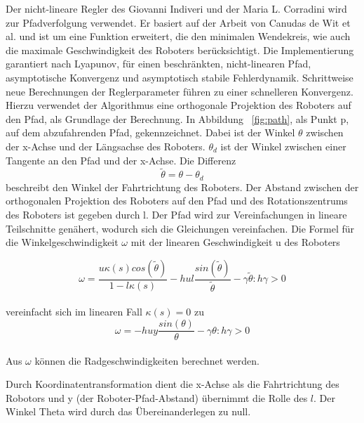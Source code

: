 \documentclass[11pt,a4paper]{article}
\begin{document}
{	Der nicht-lineare Regler des Giovanni Indiveri und der Maria L. Corradini\cite{Giovanni} wird zur Pfadverfolgung verwendet. Er basiert auf der Arbeit von Canudas de Wit et al. \cite{Canudas} und ist um eine Funktion erweitert, die den  minimalen Wendekreis, wie auch die maximale Geschwindigkeit des Roboters ber\"ucksichtigt. Die Implementierung garantiert nach Lyapunov, f\"ur einen beschr\"ankten, nicht-linearen Pfad, asymptotische Konvergenz und asymptotisch stabile Fehlerdynamik. Schrittweise neue Berechnungen der Reglerparameter f\"uhren zu einer schnelleren Konvergenz. Hierzu verwendet der Algorithmus eine orthogonale Projektion des Roboters auf den Pfad, als Grundlage der Berechnung. In Abbildung ~\ref{fig:path}, als Punkt p, auf dem abzufahrenden Pfad, gekennzeichnet.  Dabei ist der Winkel $\theta$ zwischen der x-Achse und der L\"angsachse des Roboters. $\theta_{d}$
	ist der Winkel zwischen einer Tangente  an den Pfad und der 
	x-Achse. Die Differenz 
\begin{equation}
\tilde{\theta} = \theta -\theta_{d}
\end{equation}
	beschreibt den Winkel der Fahrtrichtung des Roboters. Der Abstand zwischen der orthogonalen Projektion des Roboters auf den Pfad und des Rotationszentrums des Roboters ist gegeben durch l.
	Der Pfad wird zur Vereinfachungen in lineare Teilschnitte gen\"ahert, wodurch sich die Gleichungen vereinfachen. Die Formel f\"ur die Winkelgeschwindigkeit $\omega$ mit der linearen Geschwindigkeit u des Roboters


\begin{equation}
\omega=  \frac{u \kappa(s) cos(\tilde{\theta})}{1-l \kappa(s)}-h u l  \frac{sin(\tilde{\theta})}{\tilde{\theta}}-\gamma\tilde{\theta} :h\gamma > 0
\end{equation}\\

vereinfacht sich im linearen Fall $\kappa(s)=0$ zu \\

\begin{equation}
\omega= -h u y  \frac{sin(\theta)}{\theta}-\gamma\theta :h\gamma > 0
\end{equation}\\

	Aus $\omega$ k\"onnen die Radgeschwindigkeiten berechnet werden.

	Durch Koordinatentransformation dient die x-Achse als die Fahrtrichtung des Robotors  und y (der Roboter-Pfad-Abstand) \"ubernimmt die Rolle des $l$. Der Winkel Theta wird durch das \"Ubereinanderlegen zu null.


}
\end{document}
